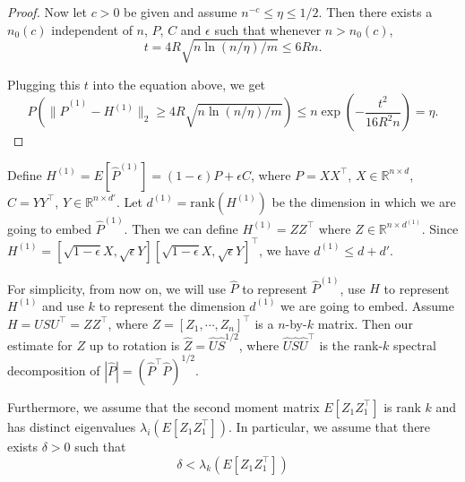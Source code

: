 \begin{proof}
Now let $c > 0$ be given and assume $n^{-c} \le \eta \le 1/2$. Then there exists a $n_0(c)$ independent of $n$, $P$, $C$ and $\epsilon$ such that whenever $n > n_0(c)$,
\[
	t =  4 R \sqrt{n \ln(n/\eta)/m} \le 6 R n.
\]

Plugging this $t$ into the equation above, we get
\[
	P(\| \hat{P}^{(1)} - H^{(1)} \|_2 \ge 4 R \sqrt{n \ln(n/\eta)/m})
    \le n \exp\left(-\frac{t^2}{16 R^2 n}\right) = \eta.
\]
\end{proof}

Define $H^{(1)} = E[\hat{P}^{(1)}] = (1-\epsilon) P + \epsilon C$, where $P = X X^{\top}$, $X \in \mathbb{R}^{n \times d}$, $C = Y Y^{\top}$, $Y \in \mathbb{R}^{n\times d'}$.
Let $d^{(1)} = \mathrm{rank}(H^{(1)})$ be the dimension in which we are going to embed $\hat{P}^{(1)}$. Then we can define $H^{(1)} = Z Z^{\top}$ where $Z \in \mathbb{R}^{n \times d^{(1)}}$.
Since $H^{(1)} = [\sqrt{1-\epsilon} X, \sqrt{\epsilon} Y] [\sqrt{1-\epsilon} X, \sqrt{\epsilon} Y]^{\top}$, we have $d^{(1)} \le d+d'$.


For simplicity, from now on, we will use $\hat{P}$ to represent $\hat{P}^{(1)}$, use $H$ to represent $H^{(1)}$ and use $k$ to represent the dimension $d^{(1)}$ we are going to embed. Assume $H = U S U^{\top} = Z Z^{\top}$, where $Z = [Z_1, \cdots, Z_n]^{\top}$ is a $n$-by-$k$ matrix. Then our estimate for $Z$ up to rotation is $\hat{Z} = \hat{U} \hat{S}^{1/2}$, where $\hat{U} \hat{S} \hat{U}^{\top}$ is the rank-$k$ spectral decomposition of $|\hat{P}| = (\hat{P}^{\top} \hat{P})^{1/2}$.

Furthermore, we assume that the second moment matrix $E[Z_1 Z_1^{\top}]$ is rank $k$ and has distinct eigenvalues $\lambda_i(E[Z_1 Z_1^{\top}])$. In particular, we assume that there exists $\delta > 0$ such that
\[
	\delta < \lambda_k(E[Z_1 Z_1^{\top}])
\]


